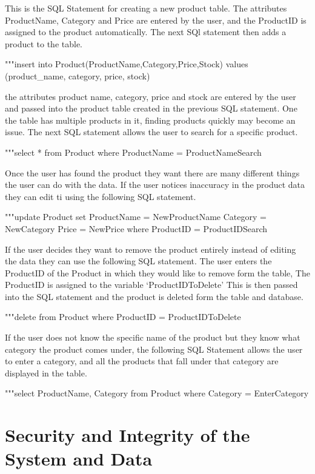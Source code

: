\begin{python}
This is the SQL Statement for creating a new product table. The attributes ProductName, Category and Price are entered by the user, and the ProductID is assigned to the product automatically. The next SQl statement then adds a product to the table.
\begin{python}
"""insert into
Product(ProductName,Category,Price,Stock) values (product_name, category, price, stock)
\end{python}

the attributes product name, category, price and stock are entered by the user and passed into the product table created in the previous SQL statement. One the table has multiple products in it, finding products quickly may become an issue. The next SQL statement allows the user to search for a specific product.
\begin{python}
        	"""select *
        	 from Product
        	 where ProductName = ProductNameSearch
\end{python}

Once the user has found the product they want there are many different things the user can do with the data. If the user notices inaccuracy in the product data they can edit ti using the following SQL statement.
\begin{python}
	"""update Product set
	ProductName = NewProductName
	 Category = NewCategory
 	Price = NewPrice
 	where ProductID = ProductIDSearch
\end{python}
If the user decides they want to remove the product entirely instead of editing the data they can use the following SQL statement. The user enters the ProductID of the Product in which they would like to remove form the table, The ProductID is assigned to the variable `ProductIDToDelete' This is then passed into the SQL statement and the product is deleted form the table and database.
\begin{python}
	"""delete from Product
 where ProductID = ProductIDToDelete
\end{python}
If the user does not know the specific name of the product but they know what category the product comes under, the following SQL Statement allows the user to enter a category, and all the products that fall under that category are displayed in the table.
\begin{python}
	"""select ProductName, Category
	from Product
	where Category = EnterCategory
\end{python}

\section{Security and Integrity of the System and Data}


\end{python}
